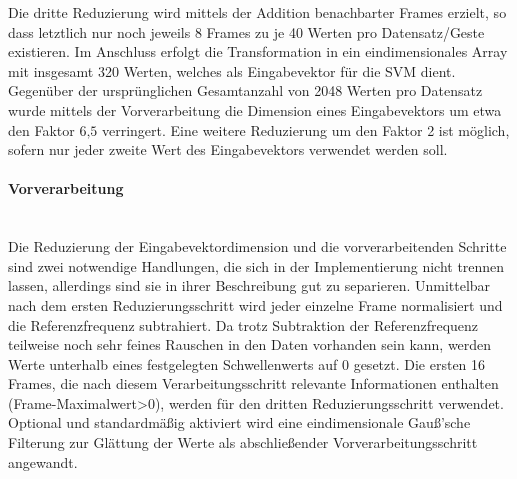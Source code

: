 Die dritte Reduzierung wird mittels der Addition benachbarter Frames erzielt, so dass letztlich nur noch jeweils 8 Frames zu je 40 Werten pro Datensatz/Geste existieren.
Im Anschluss erfolgt die Transformation in ein eindimensionales Array mit insgesamt 320 Werten, welches als Eingabevektor für die \ac{SVM} dient.
Gegenüber der ursprünglichen Gesamtanzahl von 2048 Werten pro Datensatz wurde mittels der Vorverarbeitung die Dimension eines Eingabevektors um etwa den Faktor $6\text{,}5$ verringert.
Eine weitere Reduzierung um den Faktor 2 ist möglich, sofern nur jeder zweite Wert des Eingabevektors verwendet werden soll.
\paragraph{Vorverarbeitung}\label{sec:svm_preprocess}$\;$ \\\\
Die Reduzierung der Eingabevektordimension und die vorverarbeitenden Schritte sind zwei notwendige Handlungen, die sich in der Implementierung nicht trennen lassen, allerdings sind sie in ihrer Beschreibung gut zu separieren.
Unmittelbar nach dem ersten Reduzierungsschritt wird jeder einzelne Frame normalisiert und die Referenzfrequenz subtrahiert.
Da trotz Subtraktion der Referenzfrequenz teilweise noch sehr feines Rauschen in den Daten vorhanden sein kann, werden Werte unterhalb eines festgelegten Schwellenwerts auf 0 gesetzt.
Die ersten 16 Frames, die nach diesem Verarbeitungsschritt relevante Informationen enthalten (Frame-Maximalwert\textgreater0), werden für den dritten Reduzierungsschritt verwendet.
Optional und standardmäßig aktiviert wird eine eindimensionale Gauß'sche Filterung zur Glättung der Werte als abschließender Vorverarbeitungsschritt angewandt.

